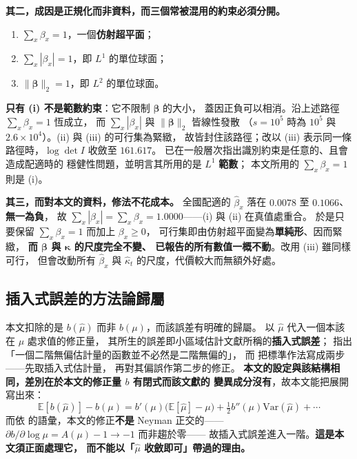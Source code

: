 \documentclass[UTF8, fontset=macnew, a4paper, 12pt]{ctexart}
\newcommand{\Ex}{\mathbb{E}}
\begin{document}
\textbf{其二，成因是正規化而非資料，而三個常被混用的約束必須分開。}

\begin{enumerate}[label=(\roman*)]
\item $\sum_x\beta_x=1$，一個\textbf{仿射超平面}；
\item $\sum_x|\beta_x|=1$，即 $L^1$ 的單位球面；
\item $\|\boldsymbol\beta\|_2=1$，即 $L^2$ 的單位球面。
\end{enumerate}

\textbf{只有 (i) 不是範數約束}：它不限制 $\boldsymbol\beta$ 的大小，
蓋因正負可以相消。沿上述路徑 $\sum_x\beta_x=1$ 恆成立，
而 $\sum_x|\beta_x|$ 與 $\|\boldsymbol\beta\|_2$ 皆線性發散
（$s=10^5$ 時為 $10^5$ 與 $2.6\times10^4$）。(ii) 與 (iii) 的可行集為緊緻，
故皆封住該路徑；改以 (iii) 表示同一條路徑時，$\log\det I$ 收斂至 $161.617$。
\citet{hunt2020} 已在一般層次指出識別約束是任意的、且會造成配適時的
穩健性問題，並明言其所用的是 $L^1$ \textbf{範數}；
本文所用的 $\sum_x\beta_x=1$ 則是 (i)。

\textbf{其三，而對本文的資料，修法不花成本。}
全國配適的 $\hat\beta_x$ 落在 $0.0078$ 至 $0.1066$、\textbf{無一為負}，
故 $\sum_x|\beta_x|=\sum_x\beta_x=1.0000$——(i) 與 (ii) 在真值處重合。
於是只要保留 $\sum_x\beta_x=1$ 而加上 $\beta_x\ge0$，
可行集即由仿射超平面變為\textbf{單純形}、因而緊緻，
\textbf{而 $\boldsymbol\beta$ 與 $\boldsymbol\kappa$ 的尺度完全不變、
已報告的所有數值一概不動}。改用 (iii) 雖同樣可行，
但會改動所有 $\hat\beta_x$ 與 $\hat\kappa_t$ 的尺度，代價較大而無額外好處。

\subsection{插入式誤差的方法論歸屬}\label{ss:plugin}

本文扣除的是 $b(\hat\mu)$ 而非 $b(\mu)$，而該誤差有明確的歸屬。
以 $\hat\mu$ 代入一個本該在 $\mu$ 處求值的修正量，
其所生的誤差即小區域估計文獻所稱的\textbf{插入式誤差}；
\citet{lahiri2023} 指出「一個二階無偏估計量的函數並不必然是二階無偏的」，
而 \citet{jiang2026} 把標準作法寫成兩步——先取插入式估計量，
再對其偏誤作第二步的修正。
\textbf{本文的設定與該結構相同，差別在於本文的修正量 $b$ 有閉式而該文獻的
變異成分沒有}，故本文能把展開寫出來：
$$\Ex[b(\hat\mu)]-b(\mu)=b'(\mu)\big(\Ex[\hat\mu]-\mu\big)
+\tfrac12 b''(\mu)\mathrm{Var}(\hat\mu)+\cdots$$
而依 \citet{chernozhukov2018} 的語彙，本文的修正\textbf{不是}
Neyman 正交的——$\partial b/\partial\log\mu=A(\mu)-1\to-1$ 而非趨於零——
故插入式誤差進入一階。\textbf{這是本文須正面處理它，
而不能以「$\hat\mu$ 收斂即可」帶過的理由。}
\end{document}
